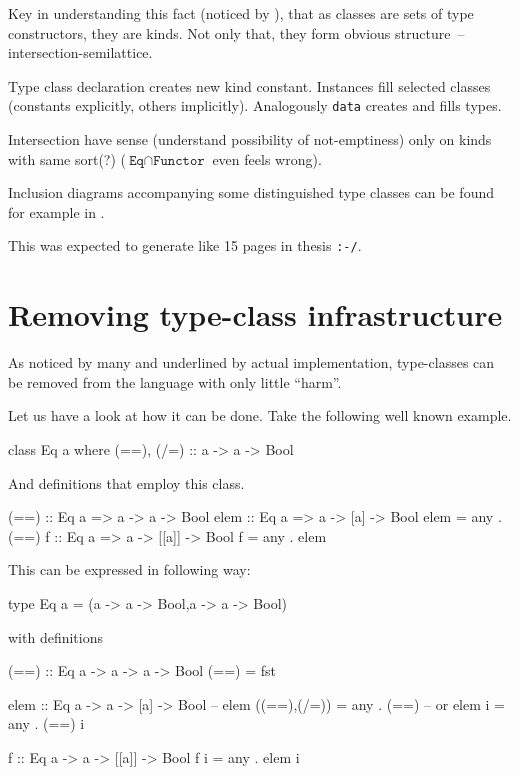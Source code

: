 \documentclass[11pt,oneside,draft]{fithesis2}
\begin{document}
Key in understanding this fact (noticed by \cite{libor}),
that as classes are sets of type constructors, they are kinds.
Not only that, they form obvious structure~-- intersection-semilattice.

Type class declaration creates new kind constant.
Instances fill selected classes (constants explicitly, others implicitly).
Analogously \texttt{data} creates and fills types.

Intersection have sense (understand possibility of not-emptiness) only on
kinds with same sort(?) (\(\texttt{Eq} \cap \texttt{Functor}\) even feels wrong).

Inclusion diagrams accompanying some distinguished type classes can be found for
example in \cite{typeclassopedia}.

This was expected to generate like 15 pages in thesis \verb~:-/~.

\section{Removing type-class infrastructure}

As noticed by many and underlined by actual implementation, type-classes can be removed
from the language with only little ``harm''.

Let us have a look at how it can be done. Take the following well known example.
\begin{code}
class Eq a where
    (==), (/=) :: a -> a -> Bool
\end{code}
And definitions that employ this class.
\begin{code}
(==) :: Eq a => a -> a -> Bool
elem :: Eq a => a -> [a] -> Bool
elem = any . (==)
f :: Eq a => a -> [[a]] -> Bool
f = any . elem
\end{code}
This can be expressed in following way:
\begin{code}
type Eq a = (a -> a -> Bool,a -> a -> Bool)
\end{code}
with definitions
\begin{code}
(==) :: Eq a -> a -> a -> Bool
(==) = fst

elem :: Eq a -> a -> [a] -> Bool
-- elem ((==),(/=)) = any . (==)
-- or
elem i = any . (==) i

f :: Eq a -> a -> [[a]] -> Bool
f i = any . elem i
\end{code}
\end{document}
